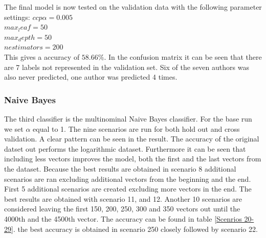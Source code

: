 \documentclass[11pt]{article}
\begin{document}
%
The final model is now tested on the validation data with the following parameter settings:
$ccp \alpha = 0.005$ \\
$max_leaf = 50$ \\
$max_depth = 50$ \\
$n estimators = 200$ \\ 
This gives a accuracy of $58.66\%$.  In the confusion matrix it can be seen that there are 7 labels not represented in the validation set. Six of the seven authors was also never predicted, one author was predicted 4 times. 
%
\subsubsection{Naive Bayes}
The third classifier is the multinominal Naive Bayes classifier. For the base run we set $\alpha$ equal to 1. 
The nine scenarios are run for both hold out and cross validation. A clear pattern can be seen in the result. The accuracy of the original datset out performs the logarithmic dataset. Furthermore it can be seen that including less vectors improves the model, both the first and the last vectors from the dataset. Because the best results are obtained in scenario 8 additional scenarios are ran excluding additional vectors from the beginning and the end.  
\newline
First 5 additional scenarios are created excluding more vectors in the end. The best results are obtained with scenario 11, and 12. Another 10 scenarios are considered leaving the first 150, 200, 250, 300 and 350 vectors out until the 4000th and the 4500th vector. The accuracy can be found in table \ref{Scenrios 20-29}. the best accuracy is obtained in scenario 250 closely followed by scenario 22.   
\end{document}
